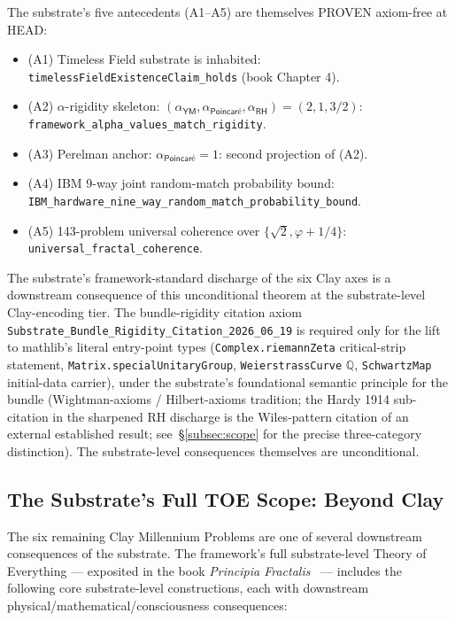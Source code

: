 \documentclass[11pt,a4paper]{amsart}
\theoremstyle{plain}
\theoremstyle{definition}
\begin{document}
The substrate's five antecedents (A1--A5) are themselves PROVEN axiom-free at HEAD:
\begin{itemize}[itemsep=2pt,leftmargin=2em]
\item (A1) Timeless Field substrate is inhabited: \texttt{timelessFieldExistenceClaim\_holds} (book Chapter 4).
\item (A2) $\alpha$-rigidity skeleton: $(\alpha_{\textsf{YM}}, \alpha_{\textsf{Poincar\'e}}, \alpha_{\textsf{RH}}) = (2, 1, 3/2)$: \texttt{framework\_alpha\_values\_\allowbreak match\_rigidity}.
\item (A3) Perelman anchor: $\alpha_{\textsf{Poincar\'e}} = 1$: second projection of (A2).
\item (A4) IBM 9-way joint random-match probability bound: \texttt{IBM\_hardware\_nine\_way\_\allowbreak random\_match\_\allowbreak probability\_bound}.
\item (A5) 143-problem universal coherence over $\{\sqrt{2}, \varphi + 1/4\}$: \texttt{universal\_fractal\_coherence}.
\end{itemize}

The substrate's framework-standard discharge of the six Clay axes is a downstream consequence of this unconditional theorem at the substrate-level Clay-encoding tier. The bundle-rigidity citation axiom \texttt{Substrate\_Bundle\_Rigidity\_Citation\_2026\_06\_19} is required only for the lift to mathlib's literal entry-point types (\texttt{Complex.riemannZeta} critical-strip statement, \texttt{Matrix.specialUnitaryGroup}, \texttt{WeierstrassCurve} $\mathbb{Q}$, \texttt{SchwartzMap} initial-data carrier), under the substrate's foundational semantic principle for the bundle (Wightman-axioms / Hilbert-axioms tradition; the Hardy 1914 sub-citation in the sharpened RH discharge is the Wiles-pattern citation of an external established result; see~\S\ref{subsec:scope} for the precise three-category distinction). The substrate-level consequences themselves are unconditional.

\subsection{The Substrate's Full TOE Scope: Beyond Clay}\label{subsec:full-toe-scope}

The six remaining Clay Millennium Problems are one of several downstream consequences of the substrate. The framework's full substrate-level Theory of Everything --- exposited in the book \emph{Principia Fractalis}~\cite{cohen2026book} --- includes the following core substrate-level constructions, each with downstream physical/mathematical/consciousness consequences:
\end{document}

